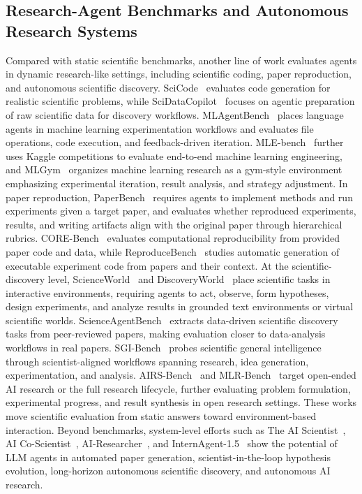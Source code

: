\subsection{Research-Agent Benchmarks and Autonomous Research Systems}
Compared with static scientific benchmarks, another line of work evaluates agents in dynamic research-like settings, including scientific coding, paper reproduction, and autonomous scientific discovery. SciCode~\citep{tian2024scicode} evaluates code generation for realistic scientific problems, while SciDataCopilot~\citep{rao2026scidatacopilot} focuses on agentic preparation of raw scientific data for discovery workflows. MLAgentBench~\citep{huang2023mlagentbench} places language agents in machine learning experimentation workflows and evaluates file operations, code execution, and feedback-driven iteration. MLE-bench~\citep{chan2025mle} further uses Kaggle competitions to evaluate end-to-end machine learning engineering, and MLGym~\citep{nathani2025mlgym} organizes machine learning research as a gym-style environment emphasizing experimental iteration, result analysis, and strategy adjustment. In paper reproduction, PaperBench~\citep{starace2025paperbench} requires agents to implement methods and run experiments given a target paper, and evaluates whether reproduced experiments, results, and writing artifacts align with the original paper through hierarchical rubrics. CORE-Bench~\citep{siegel2024core} evaluates computational reproducibility from provided paper code and data, while ReproduceBench~\citep{zhao2025autoreproduce} studies automatic generation of executable experiment code from papers and their context. At the scientific-discovery level, ScienceWorld~\citep{wang2022scienceworld} and DiscoveryWorld~\citep{jansen2024discoveryworld} place scientific tasks in interactive environments, requiring agents to act, observe, form hypotheses, design experiments, and analyze results in grounded text environments or virtual scientific worlds. ScienceAgentBench~\citep{chen2025scienceagentbench} extracts data-driven scientific discovery tasks from peer-reviewed papers, making evaluation closer to data-analysis workflows in real papers. SGI-Bench~\citep{xu2025probing} probes scientific general intelligence through scientist-aligned workflows spanning research, idea generation, experimentation, and analysis. AIRS-Bench~\citep{lupidi2026airs} and MLR-Bench~\citep{chen2026mlr} target open-ended AI research or the full research lifecycle, further evaluating problem formulation, experimental progress, and result synthesis in open research settings. These works move scientific evaluation from static answers toward environment-based interaction. Beyond benchmarks, system-level efforts such as The AI Scientist~\citep{lu2024ai}, AI Co-Scientist~\citep{gottweis2025towards}, AI-Researcher~\citep{tang2025ai}, and InternAgent-1.5~\citep{feng2026internagent15unifiedagenticframework} show the potential of LLM agents in automated paper generation, scientist-in-the-loop hypothesis evolution, long-horizon autonomous scientific discovery, and autonomous AI research.

